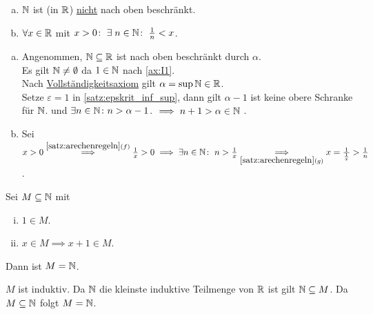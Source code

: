 \documentclass[../ana1.tex]{subfiles}
\begin{document}
\begin{satz}\label{satz:arch_prinz}\leavevmode
	\begin{enumerate}[(a)]
		\item \(\mathbb{N} \) ist (in \(\mathbb{R} \)) \underline{nicht} nach oben beschränkt.
		\item \(\forall x \in \mathbb{R} \) mit \(x > 0 \colon  \; \exists  \; n \in \mathbb{N} \colon  \; \frac{1}{n} < x \).
	\end{enumerate}
\end{satz}
\begin{bew}\leavevmode
	\begin{enumerate}[(a)]
		\item Angenommen, \(\mathbb{N} \subseteq \mathbb{R} \) ist nach oben beschränkt durch \(\alpha \). \\
		      Es gilt \(\mathbb{N} \neq \emptyset \) da \(1 \in \mathbb{N} \) nach \autoref{ax:I1}. \\
		      Nach \hyperref[ax:V]{Vollständigkeitsaxiom} gilt \(\alpha = \sup \mathbb{N} \in \mathbb{R} \). \\
		      Setze \(\varepsilon = 1 \) in \autoref{satz:epskrit_inf_sup}, dann gilt \(\alpha - 1 \) ist keine obere Schranke für \(\mathbb{N} \).
		      und \(\exists n \in \mathbb{N} \colon n > \alpha - 1 \).
			  \(\implies n+1 > \alpha \in \mathbb{N} \) \Lightning.
		\item Sei \(x > 0 \overset{\autoref{satz:arechenregeln}{(f)}}{\implies} \frac{1}{x} > 0 \implies \exists n \in \N \colon  \; n > \frac{1}{x} \\
		      \underset{\autoref{satz:arechenregeln}{(g)}}{\implies} x = \frac{1}{\frac{1}{x}} > \frac{1}{n} \).\qedhere
	\end{enumerate}
\end{bew}

\begin{satz}[Induktionsprinzip]\label{satz:ind_prinz}
	Sei \(M \subseteq \mathbb{N} \) mit
	\begin{enumerate}[(i)]
		\item \(1\in M \).
		\item \(x \in M \implies x + 1 \in M \).
	\end{enumerate}
	Dann ist \(M = \mathbb{N} \).
\end{satz}
\begin{bew}
	\(M \) ist induktiv. Da \(\mathbb{N} \) die kleinste induktive Teilmenge von \(\mathbb{R} \) ist gilt \(\mathbb{N} \subseteq M \).
	Da \(M \subseteq \mathbb{N} \) folgt \(M = \mathbb{N} \).
\end{bew}
\end{document}
